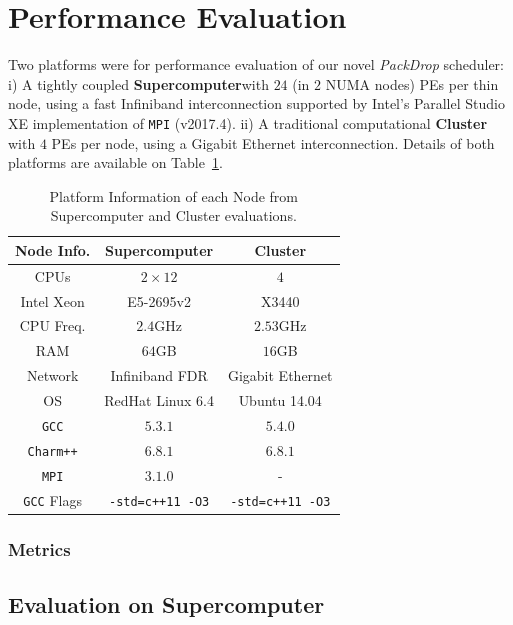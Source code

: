 \section{Performance Evaluation}

Two platforms were for performance evaluation of our novel \textit{PackDrop} scheduler:
i) A tightly coupled \textbf{Supercomputer}with $24$ (in $2$ NUMA nodes) PEs per thin node, using a fast Infiniband interconnection supported by Intel's Parallel Studio XE implementation of \texttt{MPI} (v2017.4).
ii) A traditional computational \textbf{Cluster} with $4$ PEs per node, using a Gigabit Ethernet interconnection.
Details of both platforms are available on Table~\ref{tab:ptinfo}.

\begin{table}[ht]
    \centering
	\begin{tabular}{c|c|c}
		Node Info. 			& Supercomputer 			& Cluster \\ \hline
        CPUs	   			& $2\times12$ 				& $4$ \\
        Intel Xeon			& E5-2695v2 				& X3440\\
        CPU Freq.  			& $2.4$GHz   				& $2.53$GHz\\
        RAM        			& $64$GB					& $16$GB\\
        Network 			& Infiniband FDR 			& Gigabit Ethernet\\
        OS      			& RedHat Linux 6.4 			& Ubuntu 14.04\\
        \texttt{GCC}		& $5.3.1$					& $5.4.0$\\
        \texttt{Charm++} 	& $6.8.1$ 					& $6.8.1$\\
        \texttt{MPI}		& $3.1.0$					& -\\
        \texttt{GCC} Flags	& \texttt{-std=c++11 -O3} 	& \texttt{-std=c++11 -O3} \\
	\end{tabular}
    \caption{Platform Information of each Node from Supercomputer and Cluster evaluations. }
    \label{tab:ptinfo}
\end{table}



\subsubsection*{Metrics}

\subsection{Evaluation on Supercomputer}

